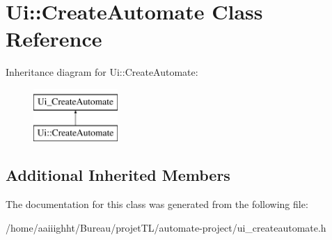 \hypertarget{class_ui_1_1_create_automate}{\section{Ui\-:\-:Create\-Automate Class Reference}
\label{class_ui_1_1_create_automate}
}
Inheritance diagram for Ui\-:\-:Create\-Automate\-:\begin{figure}[H]
\begin{center}
\leavevmode
\includegraphics[height=2.000000cm]{class_ui_1_1_create_automate}
\end{center}
\end{figure}
\subsection*{Additional Inherited Members}


The documentation for this class was generated from the following file\-:\begin{DoxyCompactItemize}
\item 
/home/aaiiighht/\-Bureau/projet\-T\-L/automate-\/project/ui\-\_\-createautomate.\-h\end{DoxyCompactItemize}
